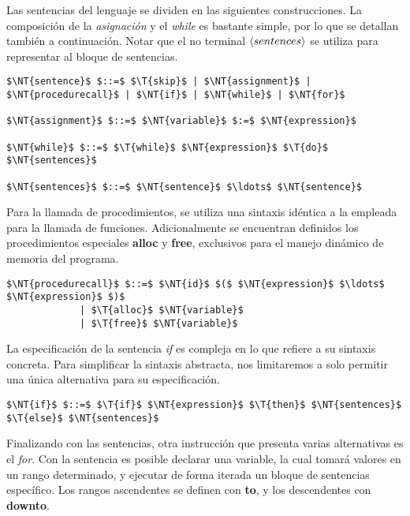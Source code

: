 Las sentencias del lenguaje se dividen en las siguientes construcciones.
La composición de la \textit{asignación} y el \textit{while} es bastante simple, por lo que se detallan también a continuación.
Notar que el no terminal $\langle sentences \rangle$ se utiliza para representar al bloque de sentencias.

\begin{lstlisting}[style = syntax]
$\NT{sentence}$ $::=$ $\T{skip}$ | $\NT{assignment}$ | $\NT{procedurecall}$ | $\NT{if}$ | $\NT{while}$ | $\NT{for}$

$\NT{assignment}$ $::=$ $\NT{variable}$ $:=$ $\NT{expression}$

$\NT{while}$ $::=$ $\T{while}$ $\NT{expression}$ $\T{do}$ $\NT{sentences}$

$\NT{sentences}$ $::=$ $\NT{sentence}$ $\ldots$ $\NT{sentence}$
\end{lstlisting}

Para la llamada de procedimientos, se utiliza una sintaxis idéntica a la empleada para la llamada de funciones.
Adicionalmente se encuentran definidos los procedimientos especiales \textbf{alloc} y \textbf{free}, exclusivos para el manejo dinámico de memoria del programa.

\begin{lstlisting}[style = syntax]
$\NT{procedurecall}$ $::=$ $\NT{id}$ $($ $\NT{expression}$ $\ldots$ $\NT{expression}$ $)$
             | $\T{alloc}$ $\NT{variable}$
             | $\T{free}$ $\NT{variable}$
\end{lstlisting}

La especificación de la sentencia \textit{if} es compleja en lo que refiere a su sintaxis concreta.
Para simplificar la sintaxis abstracta, nos limitaremos a solo permitir una única alternativa para su especificación.

\begin{lstlisting}[style = syntax]
$\NT{if}$ $::=$ $\T{if}$ $\NT{expression}$ $\T{then}$ $\NT{sentences}$ $\T{else}$ $\NT{sentences}$
\end{lstlisting}

Finalizando con las sentencias, otra instrucción que presenta varias alternativas es el \textit{for}.
Con la sentencia es posible declarar una variable, la cual tomará valores en un rango determinado, y ejecutar de forma iterada un bloque de sentencias específico.
Los rangos ascendentes se definen con \textbf{to}, y los descendentes con \textbf{downto}.

